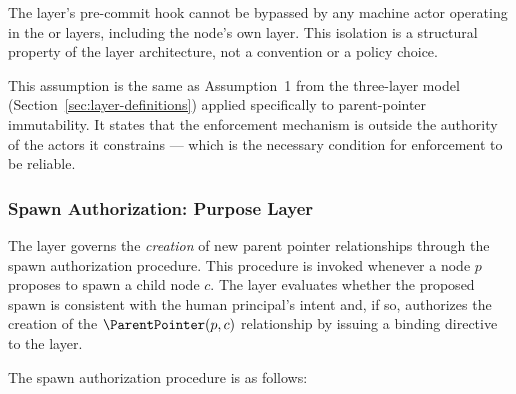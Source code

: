 \begin{assumption}\label{asm:fact-layer-isolation}
The \fact{} layer's pre-commit hook cannot be bypassed by any machine actor operating in the \bounds{} or \purpose{} layers, including the node's own \purpose{} layer. This isolation is a structural property of the layer architecture, not a convention or a policy choice.
\end{assumption}

This assumption is the same as Assumption~1 from the three-layer model (Section~\ref{sec:layer-definitions}) applied specifically to parent-pointer immutability. It states that the enforcement mechanism is outside the authority of the actors it constrains --- which is the necessary condition for enforcement to be reliable.

\subsubsection{Spawn Authorization: Purpose Layer}\label{sec:spawn-authorization}

The \purpose{} layer governs the \textit{creation} of new parent pointer relationships through the spawn authorization procedure. This procedure is invoked whenever a node $p$ proposes to spawn a child node $c$. The \purpose{} layer evaluates whether the proposed spawn is consistent with the human principal's intent and, if so, authorizes the creation of the $\ParentPointer(p, c)$ relationship by issuing a binding directive to the \fact{} layer.

The spawn authorization procedure is as follows:

